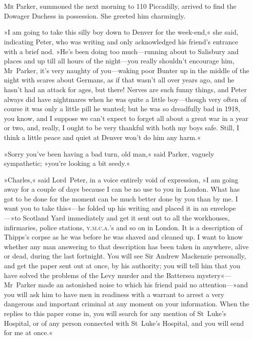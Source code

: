 \chapter[Chapter \thechapter]{}
\lettrine[lines=4]{M}{r} Parker, summoned the next morning to 110 Piccadilly, arrived to find the Dowager Duchess in possession. She greeted him charmingly.

\zz
»I am going to take this silly boy down to Denver for the week-end,« she said, indicating Peter, who was writing and only acknowledged his friend's entrance with a brief nod. »He's been doing too much—running about to Salisbury and places and up till all hours of the night—you really shouldn't encourage him, Mr~Parker, it's very naughty of you—waking poor Bunter up in the middle of the night with scares about Germans, as if that wasn't all over years ago, and he hasn't had an attack for ages, but there! Nerves are such funny things, and Peter always did have nightmares when he was quite a little boy—though very often of course it was only a little pill he wanted; but he was so dreadfully bad in 1918, you know, and I suppose we can't expect to forget all about a great war in a year or two, and, really, I ought to be very thankful with both my boys safe. Still, I think a little peace and quiet at Denver won't do him any harm.«

»Sorry you've been having a bad turn, old man,« said Parker, vaguely sympathetic; »you're looking a bit seedy.«

»Charles,« said Lord~Peter, in a voice entirely void of expression, »I am going away for a couple of days because I can be no use to you in London. What has got to be done for the moment can be much better done by you than by me. I want you to take this«---he folded up his writing and placed it in an envelope---»to Scotland Yard immediately and get it sent out to all the workhouses, infirmaries, police stations, \textsc{y.m.c.a.}'s and so on in London. It is a description of Thipps's corpse as he was before he was shaved and cleaned up. I want to know whether any man answering to that description has been taken in anywhere, alive or dead, during the last fortnight. You will see Sir Andrew Mackenzie personally, and get the paper sent out at once, by his authority; you will tell him that you have solved the problems of the Levy murder and the Battersea mystery«---Mr~Parker made an astonished noise to which his friend paid no attention---»and you will ask him to have men in readiness with a warrant to arrest a very dangerous and important criminal at any moment on your information. When the replies to this paper come in, you will search for any mention of St~Luke's Hospital, or of any person connected with St~Luke's Hospital, and you will send for me at once.«

